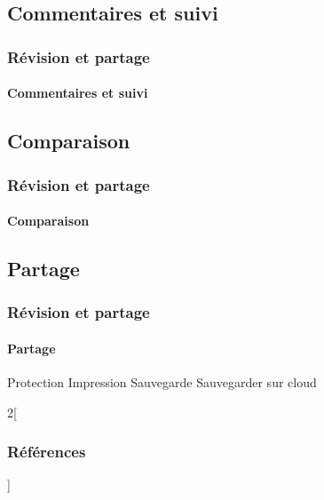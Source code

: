 \documentclass[xcolor=table]{beamer}
\begin{document}
\subsection{Commentaires et suivi}

\begin{frame}
\frametitle{Révision et partage}
\framesubtitle{Commentaires et suivi}

\end{frame}

\subsection{Comparaison}

\begin{frame}
\frametitle{Révision et partage}
\framesubtitle{Comparaison}

\end{frame}

\subsection{Partage}

\begin{frame}
\frametitle{Révision et partage}
\framesubtitle{Partage}

Protection 
Impression 
Sauvegarde 
Sauvegarder sur cloud 


\end{frame}

\nocite{*}
%
% 

\begin{multicols*}{2}[\frametitle{Références}]%
	\tiny
	
	
\end{multicols*}
\end{document}
